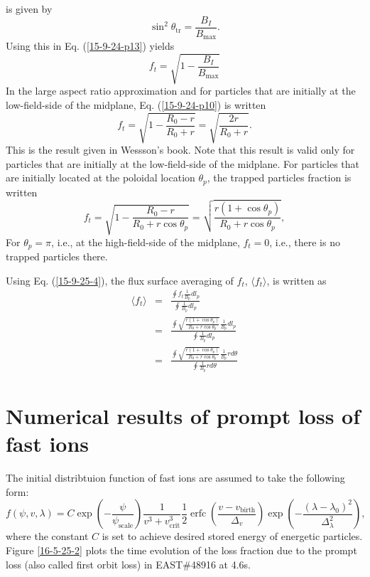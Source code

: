 \documentclass{article}
\newcommand{\tmop}[1]{\ensuremath{\operatorname{#1}}}
\begin{document}
is given by
\begin{equation}
  \sin^2 \theta_{\tmop{tr}} = \frac{B_I}{B_{\max}} .
\end{equation}
Using this in Eq. (\ref{15-9-24-p13}) yields
\begin{equation}
  \label{15-9-24-p10} f_t = \sqrt{1 - \frac{B_I}{B_{\max}}}
\end{equation}
In the large aspect ratio approximation and for particles that are initially
at the low-field-side of the midplane, Eq. (\ref{15-9-24-p10}) is written
\begin{equation}
  f_t = \sqrt{1 - \frac{R_0 - r}{R_0 + r}} = \sqrt{\frac{2 r}{R_0 + r}} .
\end{equation}
This is the result given in Wessson's book{\cite{wesson2004}}. Note that this
result is valid only for particles that are initially at the low-field-side of
the midplane. For particles that are initially located at the poloidal
location $\theta_p$, the trapped particles fraction is written
\begin{equation}
  \label{15-9-25-4} f_t = \sqrt{1 - \frac{R_0 - r}{R_0 + r \cos \theta_p}} =
  \sqrt{\frac{r (1 + \cos \theta_p) }{R_0 + r \cos \theta_p}},
\end{equation}
For $\theta_p = \pi$, i.e., at the high-field-side of the midplane, $f_t = 0$,
i.e., there is no trapped particles there.

Using Eq. (\ref{15-9-25-4}), the flux surface averaging of $f_t$, $\langle
f_t \rangle$, is written as
\begin{eqnarray*}
  \langle f_t \rangle & = & \frac{\oint f_t  \frac{1}{B_p} d l_p}{\oint
  \frac{1}{B_p} d l_p}\\
  & = & \frac{\oint \sqrt{\frac{r (1 + \cos \theta_p) }{R_0 + r \cos
  \theta_p}}  \frac{1}{B_p} d l_p}{\oint \frac{1}{B_p} d l_p}\\
  & = & \frac{\oint \sqrt{\frac{r (1 + \cos \theta_p) }{R_0 + r \cos
  \theta_p}}  \frac{1}{B_p} r d \theta}{\oint \frac{1}{B_p} r d \theta}
\end{eqnarray*}

\section{Numerical results of prompt loss of fast ions}

The initial distribtuion function of fast ions are assumed to take the
following form:
\begin{equation}
  \label{16-5-25-1} f (\psi, v, \lambda) = C \exp \left( -
  \frac{\psi}{\psi_{\tmop{scale}}} \right) \frac{1}{v^3 + v_{\tmop{crit}}^3} 
  \frac{1}{2} \tmop{erfc} \left( \frac{v - v_{\tmop{birth}}}{\Delta_v} \right)
  \exp \left( - \frac{(\lambda - \lambda_0)^2}{\Delta_{\lambda}^2} \right),
\end{equation}
where the constant $C$ is set to achieve desired stored energy of energetic
particles. Figure \ref{16-5-25-2} plots the time evolution of the loss
fraction due to the prompt loss (also called first orbit loss) in EAST\#48916
at 4.6s.
\end{document}
